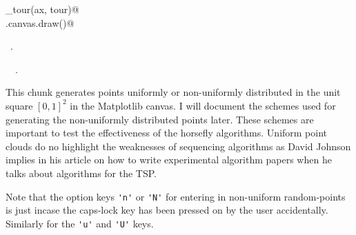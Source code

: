 \documentclass[11.5pt]{report}
\begin{document}
\begin{flushleft}
\begin{minipage}{\linewidth}
\begin{list}{}{}
\mbox{}\verb@plot_tour(ax, tour)@\\
\mbox{}\verb@fig.canvas.draw()@\\
\mbox{}\verb@@{\NWsep}
\end{list}
\vspace{-1.5ex}
\footnotesize
\begin{list}{}{\setlength{\itemsep}{-\parsep}\setlength{\itemindent}{-\leftmargin}}
\item \NWtxtMacroRefIn\ .
\item \NWtxtIdentsUsed\nobreak\  \verb@getTour@\nobreak\ .
\item{}
\end{list}
\end{minipage}\vspace{4ex}
\end{flushleft}

\vspace{-0.8cm}\newchunk This chunk generates points uniformly or non-uniformly distributed in the 
unit square $[0,1]^2$ in the Matplotlib canvas. I will document the schemes used for 
generating the non-uniformly distributed points later. These schemes are important to test the effectiveness of 
the horsefly algorithms. Uniform point clouds do no highlight the weaknesses of 
sequencing algorithms as David Johnson implies in his article on how to write 
experimental algorithm papers when he talks about algorithms for the TSP. 

Note that the option keys \verb|'n'| or \verb|'N'| for entering in non-uniform random-points is just 
incase the caps-lock key has been pressed on by the user accidentally. Similarly for the \verb|'u'|
and \verb|'U'| keys.  
\end{document}
